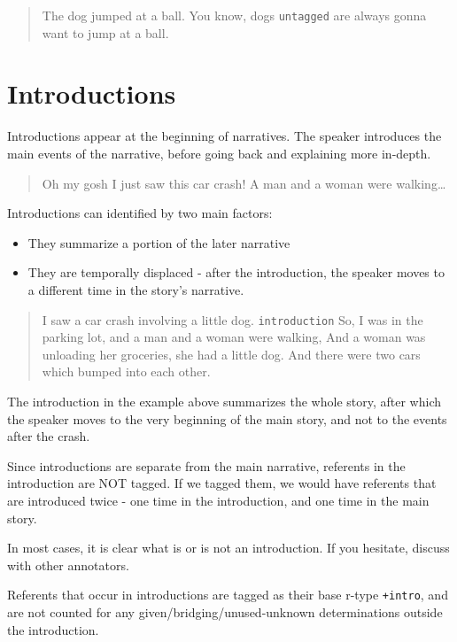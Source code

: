 \documentclass[
]{book}
\providecommand{\tightlist}{%
  \setlength{\itemsep}{0pt}\setlength{\parskip}{0pt}}
\begin{document}
\begin{quote}
The dog jumped at a ball.
You know, dogs \texttt{untagged} are always gonna want to jump at a ball.
\end{quote}

\hypertarget{introductions}{%
\section{Introductions}\label{introductions}}

Introductions appear at the beginning of narratives.
The speaker introduces the main events of the narrative,
before going back and explaining more in-depth.

\begin{quote}
Oh my gosh I just saw this car crash!
A man and a woman were walking\ldots{}
\end{quote}

Introductions can identified by two main factors:

\begin{itemize}
\tightlist
\item
  They summarize a portion of the later narrative
\item
  They are temporally displaced - after the introduction,
  the speaker moves to a different time in the story's narrative.
\end{itemize}

\begin{quote}
I saw a car crash involving a little dog. \texttt{introduction}
So, I was in the parking lot, and a man and a woman were walking,
And a woman was unloading her groceries, she had a little dog.
And there were two cars which bumped into each other.
\end{quote}

The introduction in the example above summarizes the whole story,
after which the speaker moves to the very beginning of the main story,
and not to the events after the crash.

Since introductions are separate from the main narrative,
referents in the introduction are NOT tagged. If we tagged them,
we would have referents that are introduced twice - one time in the introduction,
and one time in the main story.

In most cases, it is clear what is or is not an introduction.
If you hesitate, discuss with other annotators.

Referents that occur in introductions are tagged as their base r-type \texttt{+intro},
and are not counted for any given/bridging/unused-unknown determinations
outside the introduction.
\end{document}
